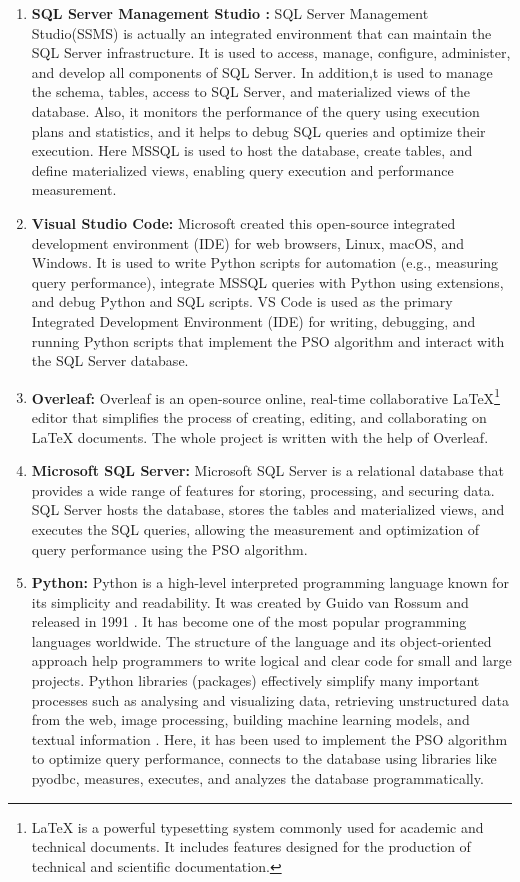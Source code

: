 \begin{enumerate}[label=(\roman*)]
\item\textbf{SQL Server Management Studio :} SQL Server Management Studio(SSMS) is actually an integrated environment that can maintain the SQL Server infrastructure. It is used to access, manage, configure, administer, and develop all components of SQL Server. In addition,t is used to manage the schema, tables, access to SQL Server, and materialized views of the database. Also, it monitors the performance of the query using execution plans and statistics, and it helps to debug SQL queries and optimize their execution. Here MSSQL is used to host the database, create tables, and define materialized views, enabling query execution and performance measurement.


\item\textbf{{Visual Studio Code:}} Microsoft created this open-source integrated development environment (IDE) for web browsers, Linux, macOS, and Windows. It is used to write Python scripts for automation (e.g., measuring query performance), integrate MSSQL queries with Python using extensions, and debug Python and SQL scripts. VS Code is used as the primary Integrated Development Environment (IDE) for writing, debugging, and running Python scripts that implement the PSO algorithm and interact with the SQL Server database.

\item\textbf{Overleaf:} Overleaf is an open-source online, real-time collaborative LaTeX\footnote{LaTeX is a powerful typesetting system commonly used for academic and technical documents. It includes features designed for the production of technical and scientific documentation.} editor that simplifies the process of creating, editing, and collaborating on LaTeX documents. The whole project is written with the help of Overleaf.

\item\textbf{Microsoft SQL Server:} Microsoft SQL Server is a relational database that provides a wide range of features for storing, processing, and securing data. SQL Server hosts the database, stores the tables and materialized views, and executes the SQL queries, allowing the measurement and optimization of query performance using the PSO algorithm.


\item\textbf{Python:} Python is a high-level interpreted programming language known for its simplicity and readability. It was created by Guido van Rossum and released in 1991 \cite{martin2023stam,wijanarko2020prediksi} . It has become one of the most popular programming languages worldwide. The structure of the language and its object-oriented approach help programmers to write logical and clear code for small and large projects. Python libraries (packages) effectively simplify many important processes such as analysing and visualizing data, retrieving unstructured data from the web, image processing, building machine learning models, and textual information \cite{Samira_Gholizadeh2022}. Here, it has been used to implement the PSO algorithm to optimize query performance, connects to the database using libraries like pyodbc, measures, executes, and analyzes the database programmatically.


\end{enumerate}
